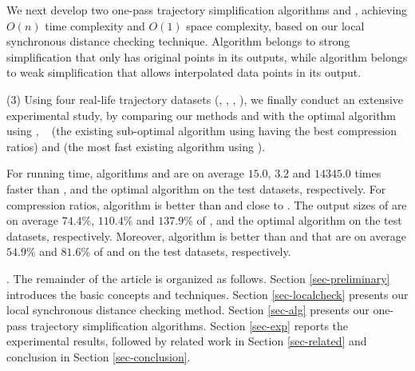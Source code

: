 
 We next develop two one-pass trajectory simplification algorithms \cist and \cista, achieving $O(n)$ time complexity and $O(1)$ space complexity, based on our local synchronous distance checking technique.
Algorithm \cist belongs to strong simplification that only has original points in its outputs, while algorithm \cista belongs to weak simplification that allows interpolated data points in its output.


\sstab (3) Using four real-life trajectory datasets (\truck, \sercar, \geolife, \pricar),
we finally conduct an extensive experimental study, by comparing our methods \cist and \cista  with the optimal \lsa algorithm using \sed, \dps~\cite{Meratnia:Spatiotemporal} (the existing sub-optimal \lsa algorithm using \sed having the best compression ratios) and \squishe \cite{Muckell:Compression} (the most fast existing \lsa algorithm using \sed).

For running time,
algorithms \cist and \cista are on average $15.0$, $3.2$ and $14345.0$ times faster than \dps, \squishe and the optimal \lsa algorithm on the test datasets, respectively.
%
For compression ratios, algorithm \cist is better than \squishe and close to \dps. The output sizes of \cist are on average $74.4\%$, $110.4\%$ and $137.9\%$ of \squishe, \dps and the optimal \lsa algorithm on the test datasets, respectively.
Moreover, algorithm \cista is better than \squishe and \dps that are on average $54.9\%$ and $81.6\%$ of \squishe and \dps on the test datasets, respectively.


.
The remainder of the article is organized as follows.
Section \ref{sec-preliminary} introduces the basic concepts and techniques.
Section \ref{sec-localcheck} presents our local synchronous distance checking method.
Section \ref{sec-alg} presents our one-pass trajectory simplification algorithms.
Section \ref{sec-exp} reports the experimental results, followed by related work in
Section \ref{sec-related} and conclusion in Section \ref{sec-conclusion}.





